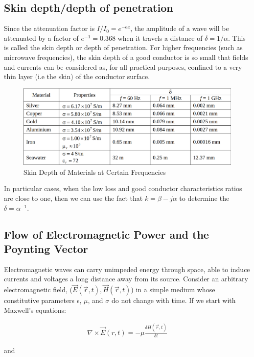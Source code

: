 \documentclass{book}
\begin{document}
\subsection{Skin depth/depth of penetration}

Since the attenuation factor is $I / I_0 = e^{-az}$, the amplitude of a wave will be attenuated by a factor of $e^{-1}=0.368$ when it travels a distance of $\delta = 1/\alpha$. This is called the skin depth or depth of penetration. For higher frequencies (such as microwave frequencies), the skin depth of a good conductor is so small that fields and currents can be considered as, for all practical purposes, confined to a very thin layer (i.e the skin) of the conductor surface. 



\begin{figure}[h]
	\centering
	\includegraphics[width=0.5\linewidth]{Screenshots/skin_depth_of_materials}
	\caption{Skin Depth of Materials at Certain Frequencies}
	\label{fig:skindepthofmaterials}
\end{figure}

In particular cases, when the low loss and good conductor characteristics ratios are close to one, then we can use the fact that $k= \beta - j \alpha$ to determine the $\delta= \alpha^{-1}$.

\subsection{Flow of Electromagnetic Power and the Poynting Vector}

Electromagnetic waves can carry unimpeded energy through space, able to induce currents and voltages a long distance away from its source. Consider an arbitrary electromagnetic field, ($\vec{E}(\vec{r}, t), \vec{H}(\vec{r},t)$) in a simple medium whose constitutive parameters $\epsilon$, $\mu$, and $\sigma$ do not change with time. If we start with Maxwell's equations:

\begin{align*}
	\nabla \times \vec{E}(r,t) = -\mu \frac{\delta H(\vec{r}, t)}{\delta t}
\end{align*}

and 
\end{document}
